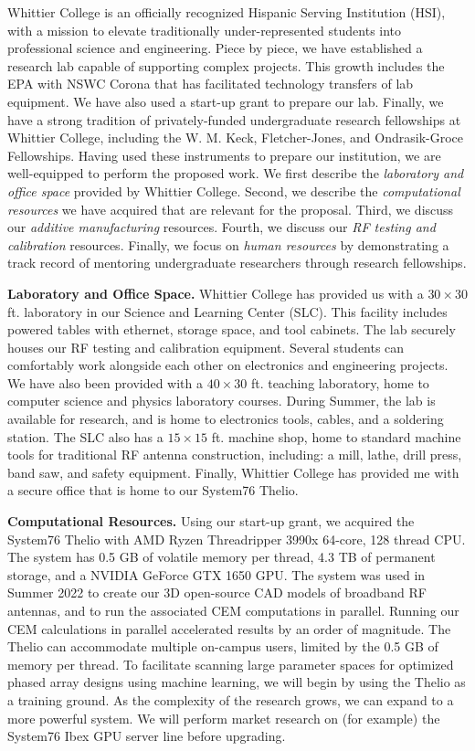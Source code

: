 \documentclass[11pt]{amsart}
\begin{document}
Whittier College is an officially recognized Hispanic Serving Institution (HSI), with a mission to elevate traditionally under-represented students into professional science and engineering.  Piece by piece, we have established a research lab capable of supporting complex projects.  This growth includes the EPA with NSWC Corona that has facilitated technology transfers of lab equipment.  We have also used a start-up grant to prepare our lab.  Finally, we have a strong tradition of privately-funded undergraduate research fellowships at Whittier College, including the W. M. Keck, Fletcher-Jones, and Ondrasik-Groce Fellowships.  Having used these instruments to prepare our institution, we are well-equipped to perform the proposed work.  We first describe the \textit{laboratory and office space} provided by Whittier College.  Second, we describe the \textit{computational resources} we have acquired that are relevant for the proposal.  Third, we discuss our \textit{additive manufacturing} resources.  Fourth, we discuss our \textit{RF testing and calibration} resources.  Finally, we focus on \textit{human resources} by demonstrating a track record of mentoring undergraduate researchers through research fellowships. 

\textbf{Laboratory and Office Space.} Whittier College has provided us with a $30 \times 30$ ft. laboratory in our Science and Learning Center (SLC).  This facility includes powered tables with ethernet, storage space, and tool cabinets.  The lab securely houses our RF testing and calibration equipment.  Several students can comfortably work alongside each other on electronics and engineering projects.  We have also been provided with a $40 \times 30$ ft. teaching laboratory, home to computer science and physics laboratory courses.  During Summer, the lab is available for research, and is home to electronics tools, cables, and a soldering station.  The SLC also has a $15 \times 15$ ft. machine shop, home to standard machine tools for traditional RF antenna construction, including: a mill, lathe, drill press, band saw, and safety equipment.  Finally, Whittier College has provided me with a secure office that is home to our System76 Thelio. 

\textbf{Computational Resources.} Using our start-up grant, we acquired the System76 Thelio with AMD Ryzen Threadripper 3990x 64-core, 128 thread CPU.  The system has 0.5 GB of volatile memory per thread, 4.3 TB of permanent storage, and a NVIDIA GeForce GTX 1650 GPU.  The system was used in Summer 2022 to create our 3D open-source CAD models of broadband RF antennas, and to run the associated CEM computations in parallel.  Running our CEM calculations in parallel accelerated results by an order of magnitude.  The Thelio can accommodate multiple on-campus users, limited by the 0.5 GB of memory per thread.  To facilitate scanning large parameter spaces for optimized phased array designs using machine learning, we will begin by using the Thelio as a training ground.  As the complexity of the research grows, we can expand to a more powerful system.  We will perform market research on (for example) the System76 Ibex GPU server line before upgrading.  
\end{document}
